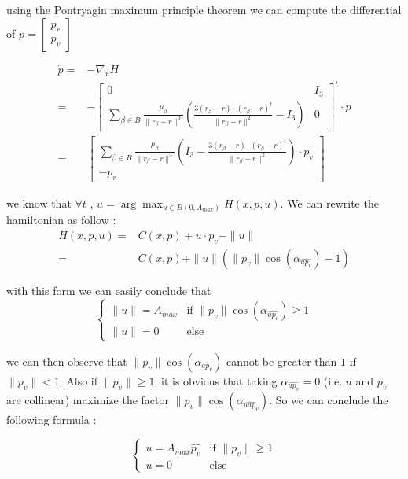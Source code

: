 \documentclass{article} %
\begin{document}
			using the Pontryagin maximum principle theorem we can compute the differential of $p=\begin{bmatrix}p_r\\p_v\end{bmatrix}$
			
			$$
			\begin{align}
				\dot{p}=&-\nabla _{x}H\\
				=&-\begin{bmatrix}
					0 & I_3\\
					\sum\limits _{\beta \in B }\frac{\mu _{\beta }}{\| r_{\beta } -r\| ^{3}}\left(\frac{3( r_{\beta } -r) \cdot ( r_{\beta } -r)^{t}}{\| r_{\beta } -r\| ^{2}} -I_3\right) & 0
				\end{bmatrix}^{t} \cdot p\\
				=&\begin{bmatrix}
					\sum\limits _{\beta \in B }\frac{\mu _{\beta }}{\| r_{\beta } -r\| ^{3}}\left(I_3-\frac{3( r_{\beta } -r) \cdot ( r_{\beta } -r)^{t}}{\| r_{\beta } -r\| ^{2}} \right)\cdot p_v\\
					-p_r
				\end{bmatrix}
			\end{align}
			$$
			
			we know that $\forall t$ , $u=\arg\max_{u\in B(0,A_{max})}H(x,p,u)$. We can rewrite the hamiltonian as follow : 
			$$
			\begin{align}
				H(x,p,u)=&C(x,p)+u\cdot p_v-\|u\| \\
				=&C(x,p)+\|u\|(\|p_v\|\cos(\alpha_{\widehat{up_v}})-1)
			\end{align}
			$$ 
			
			with this form we can easily conclude that 
			$$
			\begin{cases}
				\| u\| =A_{max} & \text{if } \|p_v\|\cos(\alpha_{\widehat{up_v}})\ge1\\
				\| u\| =0 & \text{else}
			\end{cases}
			$$
			
			we can then observe that $\|p_v\|\cos(\alpha_{\widehat{ap_v}})$ cannot be greater than $1$ if $\|p_v\| < 1$. Also if $\|p_v\| \ge 1$, it is obvious that taking $\alpha_{\widehat{up_v}}=0$ (i.e. $u$ and $p_v$ are collinear) maximize the factor $\|p_v\|\cos(\alpha_{\widehat{uap_v}})$. So we can conclude the following formula :
			
			$$
			\begin{cases}
				 u =A_{max}\widehat{p_v} & \text{if }\|p_v\| \ge 1\\
				 u =0 & \text{else}
			\end{cases}
			$$
			
\end{document}
